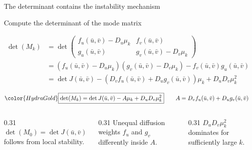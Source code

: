 \begin{frame}{The determinant contains the instability mechanism}

  \vspace{-0.08cm}

  {\color{HydraMuted}\fontsize{7.7}{9.4}\selectfont
    Compute the determinant of the mode matrix
  \par}

  \vspace{-0.16cm}

  {\color{HydraWhite}\fontsize{10}{12.7}\selectfont
  \begin{align*}
    \det(M_k)
    &=
    \det
    \begin{pmatrix}
      f_u(\bar u,\bar v)-D_u\mu_k&f_v(\bar u,\bar v)\\
      g_u(\bar u,\bar v)&g_v(\bar u,\bar v)-D_v\mu_k
    \end{pmatrix}
    \\
    &=
    \left(f_u(\bar u,\bar v)-D_u\mu_k\right)
    \left(g_v(\bar u,\bar v)-D_v\mu_k\right)
    -f_v(\bar u,\bar v)g_u(\bar u,\bar v)
    \\
    &=
    \det J(\bar u,\bar v)
    -
    \left(D_vf_u(\bar u,\bar v)+D_ug_v(\bar u,\bar v)\right)\mu_k
    +
    D_uD_v\mu_k^2
  \end{align*}
  }

  \vspace{-0.32cm}

  {\color{HydraWhite}\bfseries\fontsize{10.4}{13.2}\selectfont
  \begin{align*}
    {\color{HydraGold}
      \boxed{
        \det(M_k)
        =
        \det J(\bar u,\bar v)-A\mu_k+D_uD_v\mu_k^2
      }
    }
    \qquad
    A=D_vf_u(\bar u,\bar v)+D_ug_v(\bar u,\bar v)
  \end{align*}
  }

  \vspace{-0.14cm}

  \begin{columns}[T,onlytextwidth]
    \begin{column}{0.31\textwidth}
        {$\det(M_0)=\det J(\bar u,\bar v)>0$ follows from local stability.}
    \end{column}

    \begin{column}{0.31\textwidth}
        {Unequal diffusion weights $f_u$ and $g_v$ differently inside $A$.}
    \end{column}

    \begin{column}{0.31\textwidth}
        {$D_uD_v\mu_k^2$ dominates for sufficiently large $k$.}
    \end{column}
  \end{columns}

\end{frame}


